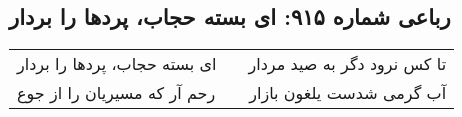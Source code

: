 \begin{center}
\section*{رباعی شماره ۹۱۵: ای بسته حجاب، پردها را بردار}
\label{sec:0915}
\begin{longtable}{l p{0.5cm} r}
ای بسته حجاب، پردها را بردار
&&
تا کس نرود دگر به صید مردار
\\
رحم آر که مسیریان را از جوع
&&
آب گرمی شدست یلغون بازار
\\
\end{longtable}
\end{center}
